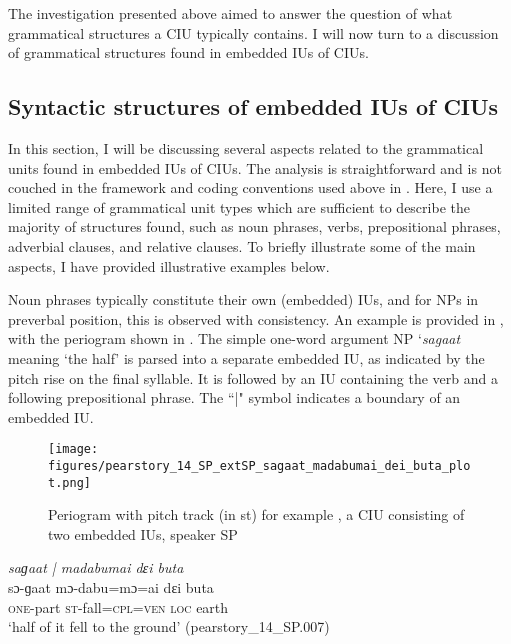 The investigation presented above aimed to answer the question of what grammatical structures a CIU typically contains. I will now turn to a discussion of grammatical structures found in embedded IUs of CIUs.





\subsection{Syntactic structures of embedded IUs of CIUs}
\label{sec:grammatical-units-and-intermediary-phrases}




In this section, I will be discussing several aspects related to the grammatical units found in embedded IUs of CIUs. The analysis is straightforward and is not couched in the framework and coding conventions used above in  . Here, I use a limited range of grammatical unit types which are sufficient to describe the majority of structures found, such as noun phrases, verbs, prepositional phrases, adverbial clauses, and relative clauses. To briefly illustrate some of the main aspects, I have provided illustrative examples below.



Noun phrases typically constitute their own (embedded) IUs, and for NPs in preverbal position, this is observed with consistency. An example is provided in , with the periogram shown in  . The simple one-word argument NP `\textit{sagaat} meaning `the half' is parsed into a separate embedded IU, as indicated by the pitch rise on the final syllable. It is followed by an IU containing the verb and a following prepositional phrase. The ``|" symbol indicates a boundary of an embedded IU.

\begin{figure}
	\texttt{[image: figures/pearstory\_14\_SP\_extSP\_sagaat\_madabumai\_dei\_buta\_plot.png]}
	\caption{Periogram with pitch track (in st) for example , a CIU consisting of two embedded IUs, speaker SP}
	\label{pitch:sagaat madabumai dɛi buta}
\end{figure}




\ea
\label{ex:sagaat madabumai dɛi buta}
\textit{saɡaat | madabumai dɛi buta} \\
\gll sɔ-ɡaat mɔ-dabu=mɔ=ai dɛi buta  \\
\textsc{one-}part \textsc{st-}fall\textsc{=cpl=ven} \textsc{loc} earth\\ 
\glt ‘half of it fell to the ground’ \hfill(pearstory\_14\_SP.007)
\z




